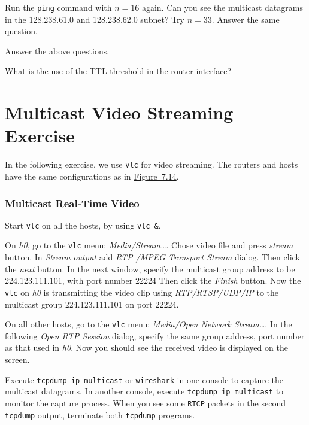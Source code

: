 \documentclass{../UTNetLab}
\begin{document}
    Run the \lstinline{ping} command with $n = 16$ again.
    Can you see the multicast datagrams in the 128.238.61.0 and 128.238.62.0 subnet?
    Try $n = 33$.
    Answer the same question.
    
    \begin{report}
    \item Answer the above questions.
    
    \item What is the use of the TTL threshold in the router interface?
    \end{report}

\part{Multicast Video Streaming Exercise}
    In the following exercise, we use \lstinline{vlc} for video streaming.
    The routers and hosts have the same configurations as in \hyperref[fig:7.14]{Figure~7.14}.

\section{Multicast Real-Time Video}
    Start \lstinline{vlc} on all the hosts, by using \lstinline{vlc &}.

    On \textit{h0}, go to the \lstinline{vlc} menu: \textit{Media/Stream\ldots }.
    Chose video file  and press \textit{stream} button.
    In \textit{Stream output} add \textit{RTP /MPEG Transport Stream} dialog.
    Then click the \textit{next} button.
    In the next window, specify the multicast group address to be {224.123.111.101}, with port number {22224} %
    Then click the \textit{Finish} button.
    Now the \lstinline{vlc} on \textit{h0} is transmitting the video clip using \textit{RTP/RTSP/UDP/IP} to the multicast group {224.123.111.101} on port {22224}.

    On all other hosts, go to the \lstinline{vlc} menu: \textit{Media/Open Network Stream\ldots}.
    In the following \textit{Open RTP Session} dialog, specify the same group address, port number as that used in \textit{h0}.%
    Now you should see the received video is displayed on the screen.

    Execute \lstinline{tcpdump ip multicast} or \lstinline{wireshark} in one console to capture the multicast datagrams.
    In another console, execute \lstinline{tcpdump ip multicast} to monitor the capture process.
    When you see some \texttt{RTCP} packets in the second \lstinline{tcpdump} output, terminate both \lstinline{tcpdump} programs.
\end{document}
